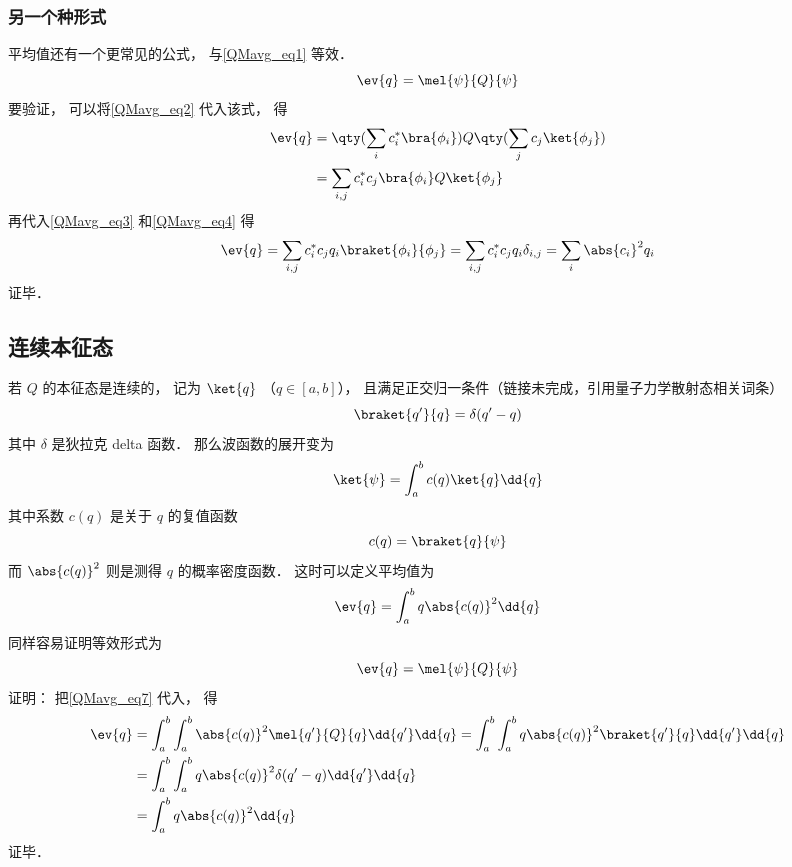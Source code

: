 \subsubsection{另一个种形式}
平均值还有一个更常见的公式， 与\autoref{QMavg_eq1} 等效．
\begin{equation}\label{QMavg_eq5}
\ev{q} = \mel{\psi}{Q}{\psi}
\end{equation}
要验证， 可以将\autoref{QMavg_eq2} 代入该式， 得
\begin{equation}
\begin{aligned}
\ev{q} &= \qty(\sum_i c_i^* \bra{\phi_i}) Q \qty(\sum_j c_j \ket{\phi_j})\\
&= \sum_{i,j} c_i^* c_j \bra{\phi_i} Q \ket{\phi_j}
\end{aligned} 
\end{equation}
再代入\autoref{QMavg_eq3} 和\autoref{QMavg_eq4} 得
\begin{equation}
\ev{q} = \sum_{i,j} c_i^* c_j q_i \braket{\phi_i}{\phi_j}
= \sum_{i,j} c_i^* c_j q_i \delta_{i,j} = \sum_i \abs{c_i}^2 q_i
\end{equation}
证毕．

\subsection{连续本征态}

若 $Q$ 的本征态是连续的， 记为 $\ket{q}$ （$q\in [a,b]$）， 且满足正交归一条件（链接未完成，引用量子力学散射态相关词条）
\begin{equation}
\braket{q'}{q} = \delta(q'-q)
\end{equation}
其中 $\delta$ 是狄拉克 delta 函数． 那么波函数的展开变为
\begin{equation}\label{QMavg_eq7}
\ket{\psi} = \int_a^b c(q) \ket{q} \dd{q}
\end{equation}
其中系数 $c(q)$ 是关于 $q$ 的复值函数
\begin{equation}
c(q) = \braket{q}{\psi}
\end{equation}
而 $\abs{c(q)}^2$ 则是测得 $q$ 的概率密度函数． 这时可以定义平均值为
\begin{equation}
\ev{q} = \int_a^b q \abs{c(q)}^2 \dd{q}
\end{equation}
同样容易证明等效形式为
\begin{equation}
\ev{q} = \mel{\psi}{Q}{\psi}
\end{equation}
证明： 把\autoref{QMavg_eq7} 代入， 得
\begin{equation}
\begin{aligned}
\ev{q} &= \int_a^b\int_a^b \abs{c(q)}^2\mel{q'}{Q}{q} \dd{q'}\dd{q} = \int_a^b\int_a^b q\abs{c(q)}^2\braket{q'}{q} \dd{q'}\dd{q}\\
&= \int_a^b\int_a^b q\abs{c(q)}^2\delta(q'-q) \dd{q'}\dd{q}\\
&= \int_a^b q\abs{c(q)}^2 \dd{q}
\end{aligned}
\end{equation}
证毕．

